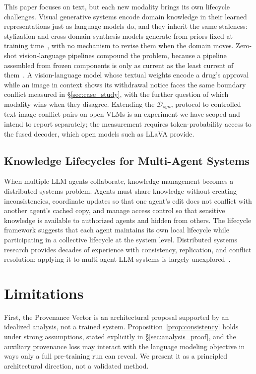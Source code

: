 \documentclass[10pt]{article}
\begin{document}
This paper focuses on text, but each new modality brings its own lifecycle challenges. Visual generative systems encode domain knowledge in their learned representations just as language models do, and they inherit the same staleness: stylization and cross-domain synthesis models generate from priors fixed at training time~\citep{thakur2021whitebox, thakur2021aoda}, with no mechanism to revise them when the domain moves. Zero-shot vision-language pipelines compound the problem, because a pipeline assembled from frozen components is only as current as the least current of them~\citep{thakur2026accident}. A vision-language model whose textual weights encode a drug's approval while an image in context shows its withdrawal notice faces the same boundary conflict measured in \S\ref{sec:case_study}, with the further question of which modality wins when they disagree. Extending the $\mathcal{D}_{sync}$ protocol to controlled text-image conflict pairs on open VLMs is an experiment we have scoped and intend to report separately; the measurement requires token-probability access to the fused decoder, which open models such as LLaVA provide.

\subsection{Knowledge Lifecycles for Multi-Agent Systems}

When multiple LLM agents collaborate, knowledge management becomes a distributed systems problem. Agents must share knowledge without creating inconsistencies, coordinate updates so that one agent's edit does not conflict with another agent's cached copy, and manage access control so that sensitive knowledge is available to authorized agents and hidden from others. The lifecycle framework suggests that each agent maintains its own local lifecycle while participating in a collective lifecycle at the system level. Distributed systems research provides decades of experience with consistency, replication, and conflict resolution; applying it to multi-agent LLM systems is largely unexplored~\citep{wang2024agents}.

\section{Limitations}
\label{sec:limitations}

First, the Provenance Vector is an architectural proposal supported by an idealized analysis, not a trained system. Proposition~\ref{prop:consistency} holds under strong assumptions, stated explicitly in \S\ref{sec:analysis_proof}, and the auxiliary provenance loss may interact with the language modeling objective in ways only a full pre-training run can reveal. We present it as a principled architectural direction, not a validated method.
\end{document}
